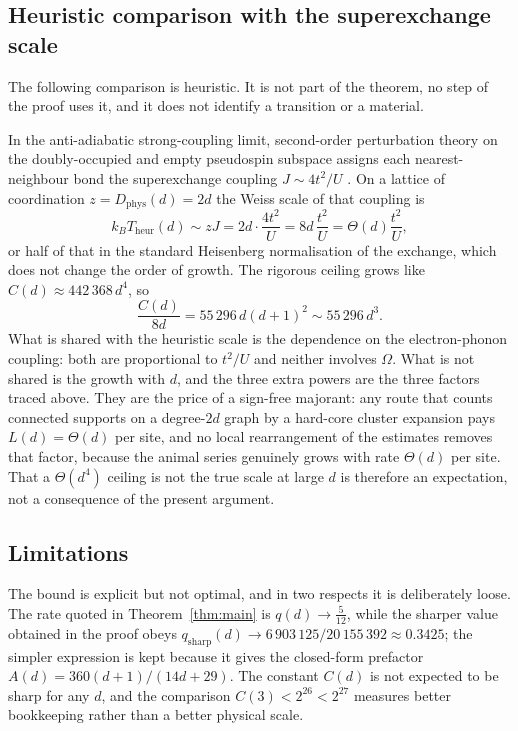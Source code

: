 \documentclass[11pt]{article}
\theoremstyle{plain}
\theoremstyle{definition}
\newcommand{\Dphys}{D_{\mathrm{phys}}}
\begin{document}
\subsection{Heuristic comparison with the superexchange scale}

The following comparison is heuristic. It is not part of the theorem, no step of the
proof uses it, and it does not identify a transition or a material.

In the anti-adiabatic strong-coupling limit, second-order perturbation theory on the
doubly-occupied and empty pseudospin subspace assigns each nearest-neighbour bond the
superexchange coupling $J\sim4t^2/U$ \cite{langfirsov}. On a lattice of coordination
$z=\Dphys(d)=2d$ the Weiss scale of that coupling is
\begin{equation}\label{eq:heuristic}
 k_BT_{\mathrm{heur}}(d)\sim zJ=2d\cdot\frac{4t^2}{U}=8d\,\frac{t^2}{U}=\Theta(d)\frac{t^2}{U},
\end{equation}
or half of that in the standard Heisenberg normalisation of the exchange, which does
not change the order of growth. The rigorous ceiling grows like
$C(d)\approx442\,368\,d^4$, so
\begin{equation}\label{eq:ratio}
 \frac{C(d)}{8d}=55\,296\,d(d+1)^2\sim55\,296\,d^3 .
\end{equation}
What is shared with the heuristic scale is the dependence on the electron-phonon
coupling: both are proportional to $t^2/U$ and neither involves $\Omega$. What is not
shared is the growth with $d$, and the three extra powers are the three factors
traced above. They are the price of a sign-free majorant: any route that counts
connected supports on a degree-$2d$ graph by a hard-core cluster expansion pays
$L(d)=\Theta(d)$ per site, and no local rearrangement of the estimates removes that
factor, because the animal series genuinely grows with rate $\Theta(d)$ per site.
That a $\Theta(d^4)$ ceiling is not the true scale at large $d$ is therefore an
expectation, not a consequence of the present argument.

\subsection{Limitations}

The bound is explicit but not optimal, and in two respects it is deliberately loose.
The rate quoted in Theorem~\ref{thm:main} is $q(d)\to\frac5{12}$, while the sharper
value obtained in the proof obeys $q_{\mathrm{sharp}}(d)\to 6\,903\,125/20\,155\,392\approx0.3425$; the simpler
expression is kept because it gives the closed-form prefactor
$A(d)=360(d+1)/(14d+29)$. The constant $C(d)$ is not expected to be sharp for any
$d$, and the comparison $C(3)<2^{26}<2^{27}$ measures better bookkeeping rather than
a better physical scale.
\end{document}
